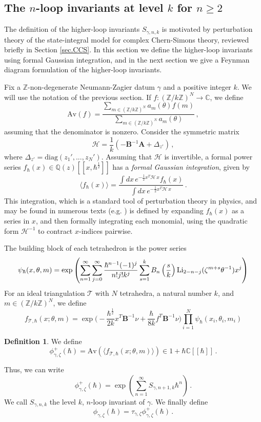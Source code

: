 \documentclass[12pt]{amsart}
\theoremstyle{definition}
\newtheorem{definition}[theorem]{Definition}
\def\BZ{\mathbb Z}
\def\BQ{\mathbb Q}
\def\BC{\mathbb C}
\def\calT{\mathcal T}
\def\ga{\gamma}
\def\la{\langle}
\def\ra{\rangle}
\def\th{\theta}
\def\longto{\longrightarrow}
\def\be{  \begin{equation} }
\def\ee{  \end{equation} }
\def\diag{\text{diag}}
\def\hb{\hbar}
\def\Av{\mathrm{Av}}
\newcommand{\CH}{\mathcal{H}}
\newcommand{\Z}{\mathbb{Z}}
\newcommand{\Li}{{\rm Li}}
\newcommand{\mb}{\mathbf}
\begin{document}
\subsection{The $n$-loop invariants  at level $k$ for $n \geq 2$}
\label{sub.all}

The definition of the higher-loop invariants $S_{\gamma,n,k}$ is motivated 
by perturbation theory of the state-integral model for complex 
Chern-Simons theory, reviewed briefly in Section \ref{sec.CCS}. 
In this section we define the higher-loop invariants using 
formal Gaussian integration, and in the next section we give a 
Feynman diagram formulation of the higher-loop invariants.

Fix a $\BZ$-non-degenerate Neumann-Zagier datum $\ga$ and a 
positive integer $k$. We will use
the notation of the previous section. 
If $f: (\BZ/k\BZ)^N \longto \BC$, we define
\be
\label{eq.Avf}
\Av(f)= \frac{\sum_{m\in (\Z/k\Z)^N} a_m(\th) f(m)}{
\sum_{m\in (\Z/k\Z)^N} a_m(\th)}\,,
\ee
assuming that the denominator is nonzero.
Consider the symmetric matrix
%
\be
\CH=\frac1k(-\mb B^{-1}\mb A+\Delta_{z'})\,,
\ee
%
where $\Delta_{z'}=\diag(z_1',...,z_N')$. Assuming that $\CH$ is invertible,
a formal power series $f_\hbar(x)\in \BQ(z)[\![x,\hbar^{\frac12}]\!]$ has a 
{\em formal Gaussian integration}, given by 
%
\be 
\label{formalG}
\la f_{\hb}(x)\ra = \frac{\int dx \, 
e^{-\frac12x^T \CH \,x}f_{\hbar}(x)}{\int dx \, e^{-\frac12x^T \CH \,x}}\,.
\ee
%
This integration,
which is a standard tool of perturbation theory in
physics, and may be found in numerous texts (e.g. \cite{BIZ})
is defined by expanding $f_\hbar(x)$ as a series in $x$, 
and then formally integrating each monomial, using the quadratic form 
$\CH^{-1}$ to contract $x$-indices pairwise. 

The building block of each tetrahedron is the power series
\be
\label{eq.block}
\psi_\hbar(x,\th,m)=\exp\left(
\sum_{n=1}^\infty\sum_{j=0}^\infty \frac{\hbar^{n-1}(-1)^j}{
n!j!k^j} \sum_{s=1}^k B_n\left(\frac{s}{k}\right) \Li_{2-n-j}(\zeta^{m+s}
\th^{-1}) x^j
\right)
\ee
%
For an ideal triangulation $\calT$ with $N$ tetrahedra, a natural number $k$, 
and $m \in (\Z/k\Z)^N$, we define 
%
\be
\label{eq.fT}
f_{\calT,\hbar}(x;\th,m)=\exp \bigg(-\frac{\hbar^{\frac12}}{2k} x^T \mb B^{-1} 
\nu +\frac\hbar{8k} f^T\mb B^{-1}\nu \bigg)
\prod_{i=1}^N \psi_\hbar(x_i,\th_i,m_i)
\ee

\begin{definition}
\label{def.phih}
We define
\be
\label{eq.defphi}
\phi^+_{\ga,\zeta}(\hbar)=\Av(\la f_{\calT,\hbar}(x;\th,m) \ra) \in 
1+\hbar\BC[\![\hbar]\!] \,.
\ee
\end{definition}
\noindent 
Thus, we can write
\be
\label{def.Sn}
\phi^+_{\ga,\zeta}(\hbar) = %
\exp\left(\sum_{n=1}^\infty S_{\ga,n+1,k} \hbar^n\right) \,.
\ee
We call $S_{\ga,n,k}$ the level $k$, $n$-loop invariant of $\ga$.
We finally define
%
\be 
\phi_{\gamma,\zeta}(\hbar) = \tau_{\gamma,\zeta}
\phi^+_{\gamma,\zeta}(\hbar)\,. 
\ee
\end{document}
